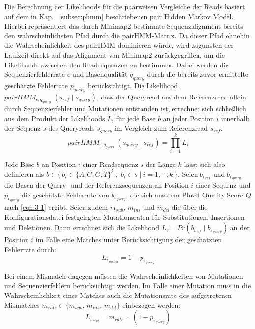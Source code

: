 Die Berechnung der Likelihoods für die paarweisen Vergleiche der Reads basiert auf dem in Kap. ~\ref{subsec:phmm} beschriebenen pair Hidden Markov Model. Hierbei repräsentiert das durch Minimap2 bestimmte Sequenzalignment bereits den wahrscheinlichsten Pfad durch die pairHMM-Matrix. Da dieser Pfad ohnehin die Wahrscheinlichkeit des pairHMM dominieren würde, wird zugunsten der Laufzeit direkt auf das Alignment von Minimap2 zurückgegriffen, um die Likelihoods zwischen den Readsequenzen zu bestimmen. Dabei werden die Sequenzierfehlerrate $ \epsilon $ und Basenqualität $ q_{query} $ durch die bereits zuvor ermittelte geschätzte Fehlerrate $ p_{query} $ berücksichtigt. Die Likelihood $ pairHMM_{\epsilon, q_{query}} \;(s_{ref}\;|\; s_{query}) $, dass der Queryread aus dem Referenzread allein durch Sequenzierfehler und Mutationen entstanden ist, errechnet sich schließlich aus dem Produkt der Likelihoods $ L_{i} $ für jede Base $ b $ an jeder Position $ i $ innerhalb der Sequenz $ s $ des Queryreads $ s_{query} $ im Vergleich zum Referenzread $ s_{ref} $.
\begin{equation} \label{eqn:3-2}
\tag{3-2}
pairHMM_{\epsilon, q_{query}} \;(s_{query}\;|\; s_{ref}) = \prod_{i=1}^{k}L_{i}
\end{equation}

Jede Base $ b $ an Position $ i $ einer Readsequenz $ s $ der Länge $ k $ lässt sich also definieren als $ b \in \{\,b_{i}\in \{A,C,G,T\}^k\;,\; b_{i} \in s \;|\; i = 1, \dotsb, k \,\}$. Seien $ b_{i\,_{ref}} $ und $ b_{i\,_{query}} $ die Basen der Query- und der Referenzsequenzen an Position $ i $ einer Sequenz und $  p_{i\,_{query}} $ die geschätzte Fehlerrate von $ b_{i\,_{query}} $, die sich aus dem Phred Quality Score $ Q $ nach  \eqref{eqn:3-1} ergibt. Seien zudem $ m_{sub} $, $ m_{ins} $ und $ m_{del} $ die über die Konfigurationsdatei festgelegten Mutationsraten für Substitutionen, Insertionen und Deletionen. Dann errechnet sich die Likelihood $ L_{i} = Pr(b_{i\,_{ref}}\;|\; b_{i\,_{query}})$ an der Position $ i $ im Falle eine Matches unter Berücksichtigung der geschätzten Fehlerrate durch:
\begin{equation} \label{eqn:3-3}
\tag{3-3}
L_{i\,_{match}} = 1 - p_{i\,_{query}}
\end{equation}

Bei einem Mismatch dagegen müssen die Wahrscheinlichkeiten von Mutationen und Sequenzierfehlern berücksichtigt werden. Im Falle einer Mutation muss in die Wahrscheinlichkeit eines Matches auch die Mutationsrate des aufgetretenen Mismatches $ m_{rate} \in \{m_{sub} $, $ m_{ins} $, $ m_{del}\} $ einbezogen werden:
\begin{equation} \label{eqn:3-4}
\tag{3-4}
L_{i\,_{mut}} = m_{rate}\; \cdotp \;(1 - p_{i\,_{query}})
\end{equation}

